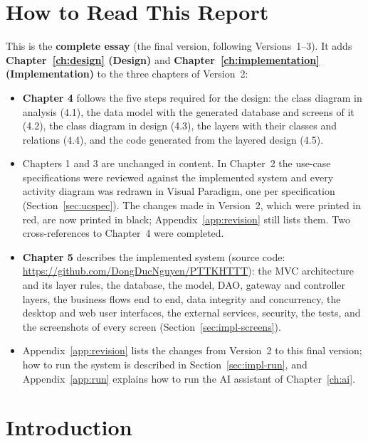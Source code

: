 \documentclass[11pt,a4paper,oneside]{extreport}
\begin{document}
\chapter*{How to Read This Report}
This is the \textbf{complete essay} (the final version, following Versions~1--3). It adds \textbf{Chapter~\ref{ch:design} (Design)} and \textbf{Chapter~\ref{ch:implementation} (Implementation)} to the three chapters of Version~2:
\begin{itemize}
  \item \textbf{Chapter 4} follows the five steps required for the design: the class diagram in analysis (4.1), the data model with the generated database and screens of it (4.2), the class diagram in design (4.3), the layers with their classes and relations (4.4), and the code generated from the layered design (4.5).
  \item Chapters 1 and 3 are unchanged in content. In Chapter~2 the use-case specifications were reviewed against the implemented system and every activity diagram was redrawn in Visual Paradigm, one per specification (Section~\ref{sec:ucspec}). The changes made in Version~2, which were printed in red, are now printed in black; Appendix~\ref{app:revision} still lists them. Two cross-references to Chapter~4 were completed.
  \item \textbf{Chapter 5} describes the implemented system (source code: \url{https://github.com/DongDucNguyen/PTTKHTTT}): the MVC architecture and its layer rules, the database, the model, DAO, gateway and controller layers, the business flows end to end, data integrity and concurrency, the desktop and web user interfaces, the external services, security, the tests, and the screenshots of every screen (Section~\ref{sec:impl-screens}).
  \item Appendix~\ref{app:revision} lists the changes from Version~2 to this final version; how to run the system is described in Section~\ref{sec:impl-run}, and Appendix~\ref{app:run} explains how to run the AI assistant of Chapter~\ref{ch:ai}.
\end{itemize}
\clearpage
{}

\chapter*{Introduction}
\end{document}

